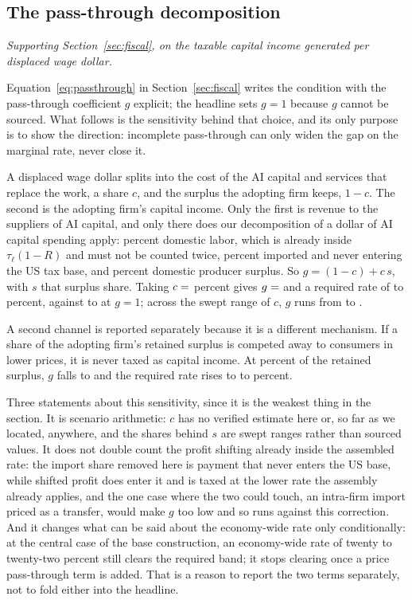 \subsection{The pass-through decomposition}

\emph{Supporting Section~\ref{sec:fiscal}, on the taxable capital income generated per displaced wage dollar.}

Equation~\eqref{eq:passthrough} in Section~\ref{sec:fiscal} writes the condition with the
pass-through coefficient $g$ explicit; the headline sets $g = 1$ because $g$ cannot be sourced.
What follows is the sensitivity behind that choice, and its only purpose is to show the
direction: incomplete pass-through can only widen the gap on the marginal rate, never close it.

A displaced wage dollar splits into the cost of the AI capital and services that replace the work,
a share $c$, and the surplus the adopting firm keeps, $1 - c$. The second is the adopting firm's
capital income. Only the first is revenue to the suppliers of AI capital, and only there does our
decomposition of a dollar of AI capital spending apply:  percent
domestic labor, which is already inside $\tau_\ell (1 - R)$ and must not be counted twice,
 percent imported and never entering the US tax base, and
 percent domestic producer surplus. So
$g = (1 - c) + c \, s$, with $s$ that surplus share. Taking $c = \result{CapitalCostShare}$
percent gives $g = \result{GCentral}$ and a required rate of  to
 percent, against  to  at
$g = 1$; across the swept range of $c$, $g$ runs from  to .

A second channel is reported separately because it is a different mechanism. If a share of the
adopting firm's retained surplus is competed away to consumers in lower prices, it is never taxed
as capital income. At  percent of the retained surplus, $g$ falls to
 and the required rate rises to  to
 percent.

Three statements about this sensitivity, since it is the weakest thing in the section. It is
scenario arithmetic: $c$ has no verified estimate here or, so far as we located, anywhere, and the
shares behind $s$ are swept ranges rather than sourced values. It does not double count the
profit shifting already inside the assembled rate: the import share removed here is payment that
never enters the US base, while shifted profit does enter it and is taxed at the lower rate the
assembly already applies, and the one case where the two could touch, an intra-firm import priced
as a transfer, would make $g$ too low and so runs against this correction. And it changes what can
be said about the economy-wide rate only conditionally: at the central case of the base
construction, an economy-wide rate of twenty to twenty-two percent still clears the required band;
it stops clearing once a price pass-through term is added. That is a reason to report the two
terms separately, not to fold either into the headline.

